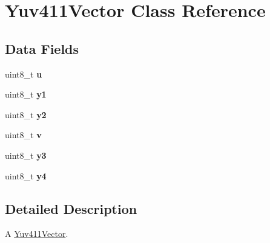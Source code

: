 \hypertarget{classGUI_1_1Player_1_1Yuv411Vector}{}\section{Yuv411\+Vector Class Reference}
\label{classGUI_1_1Player_1_1Yuv411Vector}
\subsection*{Data Fields}
\begin{DoxyCompactItemize}
\item 
\hypertarget{classGUI_1_1Player_1_1Yuv411Vector_a02ae6f520370d7aaa739c73180f091b2}{}uint8\+\_\+t {\bfseries u}\label{classGUI_1_1Player_1_1Yuv411Vector_a02ae6f520370d7aaa739c73180f091b2}

\item 
\hypertarget{classGUI_1_1Player_1_1Yuv411Vector_af2a4bde7e1b01cf2f420295ee22cf94f}{}uint8\+\_\+t {\bfseries y1}\label{classGUI_1_1Player_1_1Yuv411Vector_af2a4bde7e1b01cf2f420295ee22cf94f}

\item 
\hypertarget{classGUI_1_1Player_1_1Yuv411Vector_ab46d53655890336d982ec8600a4c5f65}{}uint8\+\_\+t {\bfseries y2}\label{classGUI_1_1Player_1_1Yuv411Vector_ab46d53655890336d982ec8600a4c5f65}

\item 
\hypertarget{classGUI_1_1Player_1_1Yuv411Vector_a467db8c58dd86cf7c97848f9fc85a4c8}{}uint8\+\_\+t {\bfseries v}\label{classGUI_1_1Player_1_1Yuv411Vector_a467db8c58dd86cf7c97848f9fc85a4c8}

\item 
\hypertarget{classGUI_1_1Player_1_1Yuv411Vector_a7f30cd571b8069087b6f2477bdfbc24a}{}uint8\+\_\+t {\bfseries y3}\label{classGUI_1_1Player_1_1Yuv411Vector_a7f30cd571b8069087b6f2477bdfbc24a}

\item 
\hypertarget{classGUI_1_1Player_1_1Yuv411Vector_a028d192d7e544c837a59835942f67b33}{}uint8\+\_\+t {\bfseries y4}\label{classGUI_1_1Player_1_1Yuv411Vector_a028d192d7e544c837a59835942f67b33}

\end{DoxyCompactItemize}


\subsection{Detailed Description}
A \hyperlink{classGUI_1_1Player_1_1Yuv411Vector}{Yuv411\+Vector}. 
